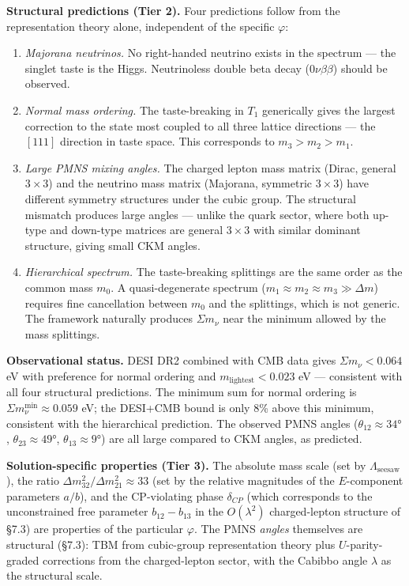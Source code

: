 \documentclass[
]{article}
\begin{document}
\textbf{Structural predictions (Tier 2).} Four predictions follow from
the representation theory alone, independent of the specific
\(\varphi\):

\begin{enumerate}
\def\labelenumi{(\roman{enumi})}
\item
  \emph{Majorana neutrinos.} No right-handed neutrino exists in the
  spectrum --- the singlet taste is the Higgs. Neutrinoless double beta
  decay (\(0\nu\beta\beta\)) should be observed.
\item
  \emph{Normal mass ordering.} The taste-breaking in \(T_1\) generically
  gives the largest correction to the state most coupled to all three
  lattice directions --- the \([111]\) direction in taste space. This
  corresponds to \(m_3 > m_2 > m_1\).
\item
  \emph{Large PMNS mixing angles.} The charged lepton mass matrix
  (Dirac, general \(3 \times 3\)) and the neutrino mass matrix
  (Majorana, symmetric \(3 \times 3\)) have different symmetry
  structures under the cubic group. The structural mismatch produces
  large angles --- unlike the quark sector, where both up-type and
  down-type matrices are general \(3 \times 3\) with similar dominant
  structure, giving small CKM angles.
\item
  \emph{Hierarchical spectrum.} The taste-breaking splittings are the
  same order as the common mass \(m_0\). A quasi-degenerate spectrum
  (\(m_1 \approx m_2 \approx m_3 \gg \Delta m\)) requires fine
  cancellation between \(m_0\) and the splittings, which is not generic.
  The framework naturally produces \(\Sigma m_\nu\) near the minimum
  allowed by the mass splittings.
\end{enumerate}

\textbf{Observational status.} DESI DR2 combined with CMB data gives
\(\Sigma m_\nu < 0.064\) eV with preference for normal ordering and
\(m_{\text{lightest}} < 0.023\) eV --- consistent with all four
structural predictions. The minimum sum for normal ordering is
\(\Sigma m_\nu^{\text{min}} \approx 0.059\) eV; the DESI+CMB bound is
only 8\% above this minimum, consistent with the hierarchical
prediction. The observed PMNS angles (\(\theta_{12} \approx 34°\),
\(\theta_{23} \approx 49°\), \(\theta_{13} \approx 9°\)) are all large
compared to CKM angles, as predicted.

\textbf{Solution-specific properties (Tier 3).} The absolute mass scale
(set by \(\Lambda_{\text{seesaw}}\)), the ratio
\(\Delta m^2_{32}/\Delta m^2_{21} \approx 33\) (set by the relative
magnitudes of the \(E\)-component parameters \(a/b\)), and the
CP-violating phase \(\delta_{CP}\) (which corresponds to the
unconstrained free parameter \(b_{12} - b_{13}\) in the \(O(\lambda^2)\)
charged-lepton structure of §7.3) are properties of the particular
\(\varphi\). The PMNS \emph{angles} themselves are structural (§7.3):
TBM from cubic-group representation theory plus \(U\)-parity-graded
corrections from the charged-lepton sector, with the Cabibbo angle
\(\lambda\) as the structural scale.
\end{document}
